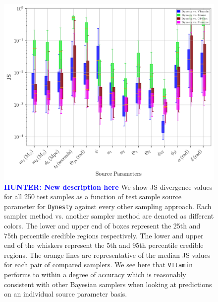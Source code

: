 \documentclass[%
showpacs,
nofootinbib,
 amsmath,amssymb,
 aps,
 twocolumn,
 prl,
 reprint,
floatfix,
]{revtex4-1}
\newcommand{\hunter}[1]{\textbf{\textcolor{blue}{HUNTER: #1}}}
\begin{document}
%
\begin{figure}
    \includegraphics[width=\textwidth]{JS_IndiPar_dynesty.png}
    \caption{\label{fig:kl_results} \hunter{New description here} We show JS divergence values for all 250 test samples as a function of test sample source parameter for \texttt{Dynesty} against every other sampling approach. Each sampler method vs. another sampler method are denoted as different colors. The lower and upper end of boxes represent the 25th and 75th percentile credible regions respectively. The lower and upper end of the whiskers represent the 5th and 95th percentile credible regions.  The orange lines are representative of the median JS values for each pair of compared samplers. We see here that \texttt{VItamin} performs to within a degree of accuracy which is reasonably consistent with other Bayesian samplers when looking at predictions on an individual source parameter basis.
      }

\end{figure}
%
\end{document}

